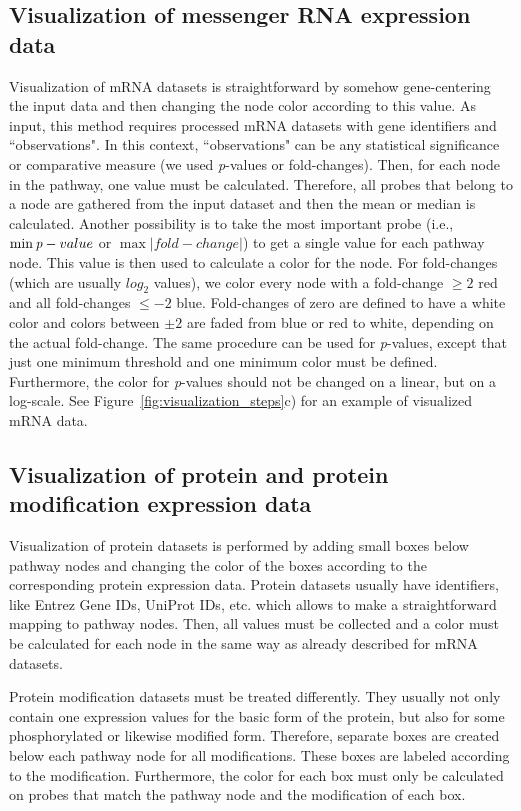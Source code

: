 \documentclass{bioinfo}
\begin{document}
\subsection{Visualization of messenger RNA expression data}

Visualization of mRNA datasets is straightforward by somehow gene-centering the input data and then changing the node color according to this value. As input, this method requires processed mRNA datasets with gene identifiers and ``observations". In this context, ``observations" can be any statistical significance or comparative measure (we used \emph{p}-values or fold-changes). Then, for each node in the pathway, one value must be calculated. Therefore, all probes that belong to a node are gathered from the input dataset and then the mean or median is calculated. Another possibility is to take the most important probe (i.e., $\min\emph{p}-value$ or $\max|fold-change|$) to get a single value for each pathway node.
This value is then used to calculate a color for the node. For fold-changes (which are usually $log_2$ values), we color every node with a fold-change $\geq2$ red and all fold-changes $\leq-2$ blue. Fold-changes of zero are defined to have a white color and colors between $\pm2$ are faded from blue or red to white, depending on the actual fold-change. The same procedure can be used for \emph{p}-values, except that just one minimum threshold and one minimum color must be defined. Furthermore, the color for \emph{p}-values should not be changed on a linear, but on a log-scale. See Figure~\ref{fig:visualization_steps}c) for an example of visualized mRNA data.

\subsection{Visualization of protein and protein modification expression data}

Visualization of protein datasets is performed by adding small boxes below pathway nodes and changing the color of the boxes according to the corresponding protein expression data. Protein datasets usually have identifiers, like Entrez Gene IDs, UniProt IDs, etc. which allows to make a straightforward mapping to pathway nodes. Then, all values must be collected and a color must be calculated for each node in the same way as already described for mRNA datasets.


Protein modification datasets must be treated differently. They usually not only contain one expression values for the basic form of the protein, but also for some phosphorylated or likewise modified form. Therefore, separate boxes are created below each pathway node for all modifications. These boxes are labeled according to the modification. Furthermore, the color for each box must only be calculated on probes that match the pathway node and the modification of each box.
\end{document}
